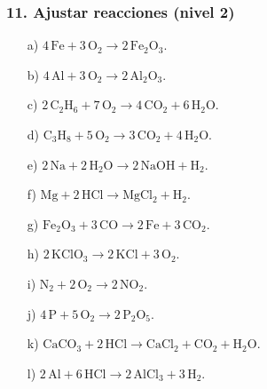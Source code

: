 \subsubsection*{11. Ajustar reacciones (nivel 2)}
\begin{enumerate}
    \item[a)] $4\,\mathrm{Fe}+3\,\mathrm{O_2}\rightarrow2\,\mathrm{Fe_2O_3}$.
    \item[b)] $4\,\mathrm{Al}+3\,\mathrm{O_2}\rightarrow2\,\mathrm{Al_2O_3}$.
    \item[c)] $2\,\mathrm{C_2H_6}+7\,\mathrm{O_2}\rightarrow
    4\,\mathrm{CO_2}+6\,\mathrm{H_2O}$.
    \item[d)] $\mathrm{C_3H_8}+5\,\mathrm{O_2}\rightarrow
    3\,\mathrm{CO_2}+4\,\mathrm{H_2O}$.
    \item[e)] $2\,\mathrm{Na}+2\,\mathrm{H_2O}\rightarrow
    2\,\mathrm{NaOH}+\mathrm{H_2}$.
    \item[f)] $\mathrm{Mg}+2\,\mathrm{HCl}\rightarrow
    \mathrm{MgCl_2}+\mathrm{H_2}$.
    \item[g)] $\mathrm{Fe_2O_3}+3\,\mathrm{CO}\rightarrow
    2\,\mathrm{Fe}+3\,\mathrm{CO_2}$.
    \item[h)] $2\,\mathrm{KClO_3}\rightarrow2\,\mathrm{KCl}+3\,\mathrm{O_2}$.
    \item[i)] $\mathrm{N_2}+2\,\mathrm{O_2}\rightarrow2\,\mathrm{NO_2}$.
    \item[j)] $4\,\mathrm{P}+5\,\mathrm{O_2}\rightarrow2\,\mathrm{P_2O_5}$.
    \item[k)] $\mathrm{CaCO_3}+2\,\mathrm{HCl}\rightarrow
    \mathrm{CaCl_2}+\mathrm{CO_2}+\mathrm{H_2O}$.
    \item[l)] $2\,\mathrm{Al}+6\,\mathrm{HCl}\rightarrow
    2\,\mathrm{AlCl_3}+3\,\mathrm{H_2}$.
\end{enumerate}

